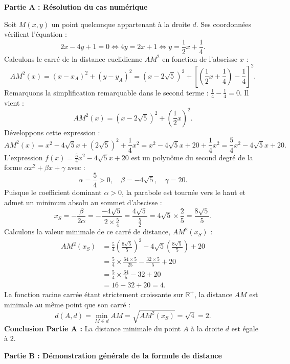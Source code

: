 \documentclass[11pt,a4paper]{article}
\newcommand{\R}{\mathbb{R}}
\begin{document}
\begin{correctionbox}
\textbf{Partie A : Résolution du cas numérique}

Soit $M(x, y)$ un point quelconque appartenant à la droite $d$.
Ses coordonnées vérifient l'équation :
\[
2x - 4y + 1 = 0 \iff 4y = 2x + 1 \iff y = \frac{1}{2}x + \frac{1}{4}.
\]
Calculons le carré de la distance euclidienne $AM^2$ en fonction de l'abscisse $x$ :
\[
AM^2(x) = (x - x_A)^2 + (y - y_A)^2 = (x - 2\sqrt{5})^2 + \left[\left(\frac{1}{2}x + \frac{1}{4}\right) - \frac{1}{4}\right]^2.
\]
Remarquons la simplification remarquable dans le second terme : $\frac{1}{4} - \frac{1}{4} = 0$. Il vient :
\[
AM^2(x) = (x - 2\sqrt{5})^2 + \left(\frac{1}{2}x\right)^2.
\]
Développons cette expression :
\[
AM^2(x) = x^2 - 4\sqrt{5}x + (2\sqrt{5})^2 + \frac{1}{4}x^2 = x^2 - 4\sqrt{5}x + 20 + \frac{1}{4}x^2 = \frac{5}{4}x^2 - 4\sqrt{5}x + 20.
\]
L'expression $f(x) = \frac{5}{4}x^2 - 4\sqrt{5}x + 20$ est un polynôme du second degré de la forme $\alpha x^2 + \beta x + \gamma$ avec :
\[
\alpha = \frac{5}{4} > 0, \quad \beta = -4\sqrt{5}, \quad \gamma = 20.
\]
Puisque le coefficient dominant $\alpha > 0$, la parabole est tournée vers le haut et admet un minimum absolu au sommet d'abscisse :
\[
x_S = -\frac{\beta}{2\alpha} = -\frac{-4\sqrt{5}}{2 \times \frac{5}{4}} = \frac{4\sqrt{5}}{\frac{5}{2}} = 4\sqrt{5} \times \frac{2}{5} = \frac{8\sqrt{5}}{5}.
\]
Calculons la valeur minimale de ce carré de distance, $AM^2(x_S)$ :
\begin{align*}
AM^2(x_S) &= \frac{5}{4}\left(\frac{8\sqrt{5}}{5}\right)^2 - 4\sqrt{5}\left(\frac{8\sqrt{5}}{5}\right) + 20 \\
&= \frac{5}{4} \times \frac{64 \times 5}{25} - \frac{32 \times 5}{5} + 20 \\
&= \frac{5}{4} \times \frac{64}{5} - 32 + 20 \\
&= 16 - 32 + 20 = 4.
\end{align*}
La fonction racine carrée étant strictement croissante sur $\R^+$, la distance $AM$ est minimale au même point que son carré :
\[
d(A, d) = \min_{M \in d} AM = \sqrt{AM^2(x_S)} = \sqrt{4} = 2.
\]
\textbf{Conclusion Partie A :} La distance minimale du point $A$ à la droite $d$ est égale à $2$.

\vspace{0.3cm}
\textbf{Partie B : Démonstration générale de la formule de distance}


\end{correctionbox}
\end{document}

